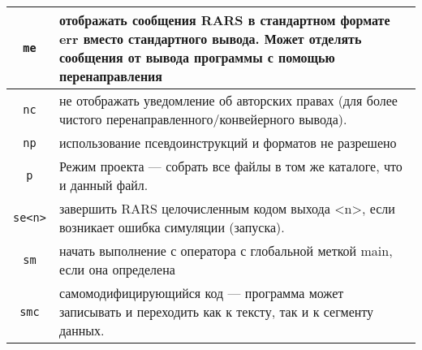 \begin{table}[h]
\begin{tabularx}{\textwidth}{|c|X|}
        \hline
        \texttt{me} & отображать сообщения RARS в стандартном формате err вместо стандартного вывода. Может отделять сообщения от вывода программы с помощью перенаправления \\
        \hline
        \texttt{nc} & не отображать уведомление об авторских правах (для более чистого перенаправленного/конвейерного вывода). \\
        \hline
        \texttt{np} & использование псевдоинструкций и форматов не разрешено \\
        \hline
        \texttt{p} & Режим проекта --- собрать все файлы в том же каталоге, что и данный файл. \\
        \hline
        \texttt{se<n>} & завершить RARS целочисленным кодом выхода <n>, если возникает ошибка симуляции (запуска). \\
        \hline
        \texttt{sm} & начать выполнение с оператора с глобальной меткой main, если она определена \\
        \hline
        \texttt{smc} & самомодифицирующийся код --- программа может записывать и переходить как к тексту, так и к сегменту данных. \\
        \hline
    \end{tabularx}
\label{table-option}
\end{table}

